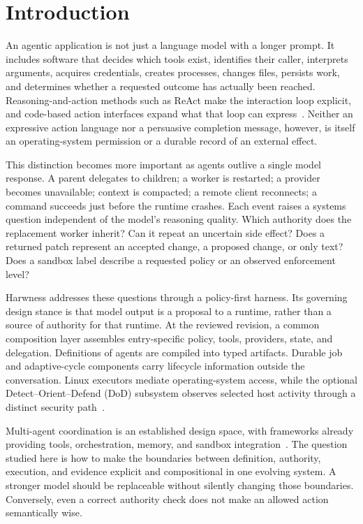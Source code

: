 \section{Introduction}
\label{sec:introduction}

An agentic application is not just a language model with a longer prompt. It includes software that decides which tools exist, identifies their caller, interprets arguments, acquires credentials, creates processes, changes files, persists work, and determines whether a requested outcome has actually been reached. Reasoning-and-action methods such as ReAct make the interaction loop explicit, and code-based action interfaces expand what that loop can express~\cite{ref1,ref2}. Neither an expressive action language nor a persuasive completion message, however, is itself an operating-system permission or a durable record of an external effect.

This distinction becomes more important as agents outlive a single model response. A parent delegates to children; a worker is restarted; a provider becomes unavailable; context is compacted; a remote client reconnects; a command succeeds just before the runtime crashes. Each event raises a systems question independent of the model's reasoning quality. Which authority does the replacement worker inherit? Can it repeat an uncertain side effect? Does a returned patch represent an accepted change, a proposed change, or only text? Does a sandbox label describe a requested policy or an observed enforcement level?

Harwness addresses these questions through a policy-first harness. Its governing design stance is that model output is a proposal to a runtime, rather than a source of authority for that runtime. At the reviewed revision, a common composition layer assembles entry-specific policy, tools, providers, state, and delegation. Definitions of agents are compiled into typed artifacts. Durable job and adaptive-cycle components carry lifecycle information outside the conversation. Linux executors mediate operating-system access, while the optional Detect--Orient--Defend (DoD) subsystem observes selected host activity through a distinct security path~\cite{ref3,ref4,ref5,ref6,ref7}.

Multi-agent coordination is an established design space, with frameworks already providing tools, orchestration, memory, and sandbox integration~\cite{ref8}. The question studied here is how to make the boundaries between definition, authority, execution, and evidence explicit and compositional in one evolving system. A stronger model should be replaceable without silently changing those boundaries. Conversely, even a correct authority check does not make an allowed action semantically wise.

